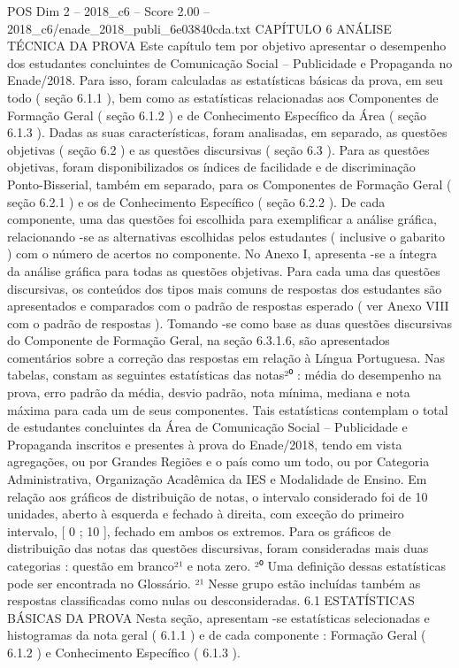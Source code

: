 \begin{textsample}{POS Dim 2 – 2018\_c6 – Score 2.00 – 2018\_c6/enade\_2018\_publi\_6e03840cda.txt}  \label{ex:f2_pos_194}
CAPÍTULO 6 ANÁLISE TÉCNICA DA PROVA Este capítulo tem por objetivo apresentar o desempenho dos estudantes concluintes de Comunicação Social – Publicidade e Propaganda no Enade/2018.
Para isso, foram calculadas as estatísticas básicas da prova, em seu todo ( seção 6.1.1 ), bem como as estatísticas relacionadas aos Componentes de Formação Geral ( seção 6.1.2 ) e de Conhecimento Específico da Área ( seção 6.1.3 ).
Dadas as suas características, foram analisadas, em separado, as questões objetivas ( seção 6.2 ) e as questões discursivas ( seção 6.3 ).
Para as questões objetivas, foram disponibilizados os índices de facilidade e de discriminação Ponto-Bisserial, também em separado, para os Componentes de Formação Geral ( seção 6.2.1 ) e os de Conhecimento Específico ( seção 6.2.2 ).
De cada componente, uma das questões foi escolhida para exemplificar a análise gráfica, relacionando -se as alternativas escolhidas pelos estudantes ( inclusive o gabarito ) com o número de acertos no componente.
No Anexo I, apresenta -se a íntegra da análise gráfica para todas as questões objetivas.
Para cada uma das questões discursivas, os conteúdos dos tipos mais comuns de respostas dos estudantes são apresentados e comparados com o padrão de respostas esperado ( ver Anexo VIII com o padrão de respostas ).
Tomando -se como base as duas questões discursivas do Componente de Formação Geral, na seção 6.3.1.6, são apresentados comentários sobre a correção das respostas em relação à Língua Portuguesa.
Nas tabelas, constam as seguintes estatísticas das notas²⁰ : média do desempenho na prova, erro padrão da média, desvio padrão, nota mínima, mediana e nota máxima para cada um de seus componentes.
Tais estatísticas contemplam o total de estudantes concluintes da Área de Comunicação Social – Publicidade e Propaganda inscritos e presentes à prova do Enade/2018, tendo em vista agregações, ou por Grandes Regiões e o país como um todo, ou por Categoria Administrativa, Organização Acadêmica da IES e Modalidade de Ensino.
Em relação aos gráficos de distribuição de notas, o intervalo considerado foi de 10 unidades, aberto à esquerda e fechado à direita, com exceção do primeiro intervalo, [ 0 ; 10 ], fechado em ambos os extremos.
Para os gráficos de distribuição das notas das questões discursivas, foram consideradas mais duas categorias : questão em branco²¹ e nota zero. ²⁰ Uma definição dessas estatísticas pode ser encontrada no Glossário. ²¹ Nesse grupo estão incluídas também as respostas classificadas como nulas ou desconsideradas. 6.1 ESTATÍSTICAS BÁSICAS DA PROVA Nesta seção, apresentam -se estatísticas selecionadas e histogramas da nota geral ( 6.1.1 ) e de cada componente : Formação Geral ( 6.1.2 ) e Conhecimento Específico ( 6.1.3 ).

\end{textsample}
